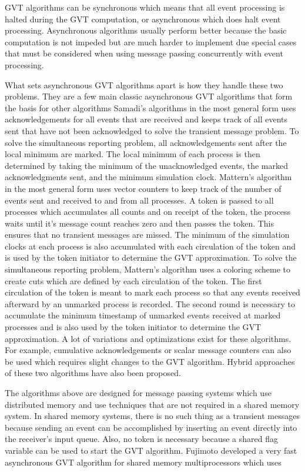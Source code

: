 \documentclass[11pt]{book}
\begin{document}
GVT algorithms can be synchronous which means that all event processing is halted during the GVT 
computation, or asynchronous which does halt event processing. Asynchronous algorithms usually
perform better because the basic computation is not impeded but are much harder to implement due
special cases that must be considered when using message passing concurrently with event processing.

What sets asynchronous GVT algorithms apart is how they handle these two problems. They are a few
main classic asynchronous GVT algorithms that form the basis for other algorithms
Samadi’s\cite{samadi-85} algorithms in the most general form uses acknowledgements for all events
that are received and keeps track of all events sent that have not been acknowledged to solve the
transient message problem. To solve the simultaneous reporting problem, all acknowledgements sent
after the local minimum are marked. The local minimum of each process is then determined by taking
the minimum of the unacknowledged events, the marked acknowledgments sent, and the minimum
simulation clock. Mattern’s algorithm in the most general form uses vector counters to keep track
of the number of events sent and received to and from all processes. A token is passed to all
processes which accumulates all counts and on receipt of the token, the process waits until it’s
message count reaches zero and then passes the token. This ensures that no transient messages are
missed. The minimum of the simulation clocks at each process is also accumulated with each circulation
of the token and is used by the token initiator to determine the GVT approximation. To solve the
simultaneous reporting problem, Mattern’s algorithm uses a coloring scheme to create cuts which
are defined by each circulation of the token. The first circulation of the token is meant to mark
each process so that any events received afterward by an unmarked process is recorded. The second
round is necessary to accumulate the minimum timestamp of unmarked events received at marked
processes and is also used by the token initiator to determine the GVT approximation. A lot of
variations and optimizations exist for these algorithms. For example, cumulative acknowledgements
or scalar message counters can also be used which requires slight changes to the GVT algorithm.
Hybrid approaches of these two algorithms have also been proposed.

The algorithms above are designed for message passing systems which use distributed memory and use
techniques that are not required in a shared memory system. In shared memory systems, there is no
such thing as a transient messages because sending an event can be accomplished by inserting an
event directly into the receiver's input queue. Also, no token is necessary because a shared flag
variable can be used to start the GVT algorithm. Fujimoto developed a very fast asynchronous GVT
algorithm for shared memory multiprocessors which uses
\end{document}
